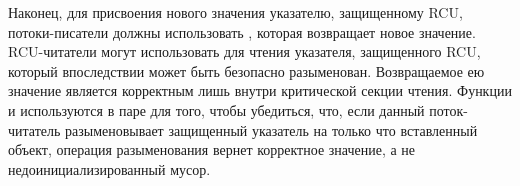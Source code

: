 Наконец, для присвоения нового значения указателю, защищенному RCU,
потоки-писатели должны использовать ,
которая возвращает новое значение.
RCU-читатели могут использовать  для чтения
указателя, защищенного RCU, который впоследствии может быть безопасно разыменован.
Возвращаемое ею значение является корректным лишь внутри критической секции чтения.
Функции  и  используются в паре
для того, чтобы убедиться, что, если данный поток-читатель разыменовывает
защищенный указатель на только что вставленный объект, операция разыменования
вернет корректное значение, а не недоинициализированный мусор.
